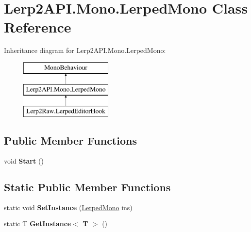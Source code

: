 \hypertarget{class_lerp2_a_p_i_1_1_mono_1_1_lerped_mono}{}\section{Lerp2\+A\+P\+I.\+Mono.\+Lerped\+Mono Class Reference}
\label{class_lerp2_a_p_i_1_1_mono_1_1_lerped_mono}
Inheritance diagram for Lerp2\+A\+P\+I.\+Mono.\+Lerped\+Mono\+:\begin{figure}[H]
\begin{center}
\leavevmode
\includegraphics[height=3.000000cm]{class_lerp2_a_p_i_1_1_mono_1_1_lerped_mono}
\end{center}
\end{figure}
\subsection*{Public Member Functions}
\begin{DoxyCompactItemize}
\item 
\mbox{\label{class_lerp2_a_p_i_1_1_mono_1_1_lerped_mono_adb4749c8a1e4c6b7d38e60c2884a1d49}} 
void {\bfseries Start} ()
\end{DoxyCompactItemize}
\subsection*{Static Public Member Functions}
\begin{DoxyCompactItemize}
\item 
\mbox{\label{class_lerp2_a_p_i_1_1_mono_1_1_lerped_mono_ae990bb6044872631869b3279e875f1a2}} 
static void {\bfseries Set\+Instance} (\hyperlink{class_lerp2_a_p_i_1_1_mono_1_1_lerped_mono}{Lerped\+Mono} ins)
\item 
\mbox{\label{class_lerp2_a_p_i_1_1_mono_1_1_lerped_mono_afe3ab7d89480e841defb5a7a31a06d07}} 
static T {\bfseries Get\+Instance$<$ T $>$} ()
\end{DoxyCompactItemize}
